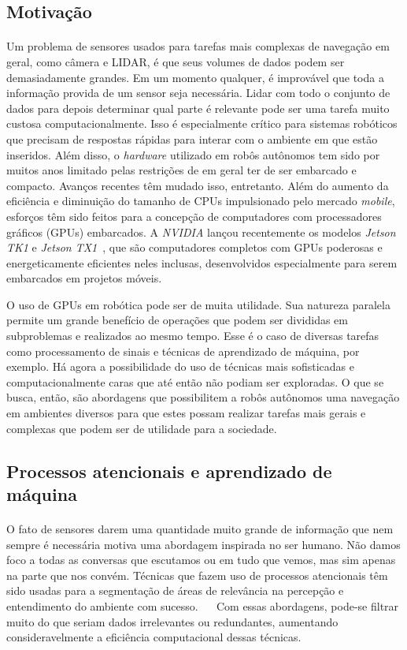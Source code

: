 \documentclass[10pt]{article}
\newcommand{\tit}[1]{\textit{#1}}
\begin{document}
\subsection{Motivação}
\paragraph{}
Um problema de sensores usados para tarefas mais complexas de navegação
em geral, como câmera e LIDAR, 
é que seus volumes de dados podem ser demasiadamente grandes. 
Em um momento qualquer, é improvável que 
toda a informação provida de um sensor seja necessária. 
Lidar com todo o conjunto de dados para depois determinar qual parte é 
relevante pode ser uma tarefa muito custosa computacionalmente. 
Isso é especialmente crítico para sistemas robóticos que precisam de respostas
rápidas para interar com o ambiente em que estão inseridos. 
Além disso, o \tit{hardware} utilizado em robôs autônomos tem sido por muitos 
anos limitado pelas restrições de em geral ter de ser embarcado e compacto.
Avanços recentes têm mudado isso, entretanto. 
Além do aumento da eficiência e diminuição do tamanho de CPUs impulsionado
pelo mercado \tit{mobile}, esforços têm sido feitos para a concepção de 
computadores com processadores gráficos (GPUs) embarcados. 
A \tit{NVIDIA} lançou recentemente os modelos 
\tit{Jetson TK1} e \tit{Jetson TX1}~\cite{jetson}, que são computadores 
completos com GPUs poderosas e energeticamente eficientes neles inclusas, 
desenvolvidos especialmente para serem embarcados em projetos móveis.

O uso de GPUs em robótica pode ser de muita utilidade.
Sua natureza paralela permite um grande benefício de operações que podem ser
divididas em subproblemas e realizados ao mesmo tempo. 
Esse é o caso de diversas tarefas como processamento de sinais e técnicas 
de aprendizado de máquina, por exemplo. 
Há agora a possibilidade do uso de técnicas mais sofisticadas
e computacionalmente caras que até então não podiam ser exploradas.
O que se busca, então, são abordagens que possibilitem a robôs autônomos
uma navegação em ambientes diversos para que estes possam realizar tarefas
mais gerais e complexas que podem ser de utilidade para a sociedade.

\subsection{Processos atencionais e aprendizado de máquina}
\paragraph{}
O fato de sensores darem uma quantidade muito grande de informação que nem 
sempre é necessária motiva uma abordagem inspirada no ser humano.
Não damos foco a todas as conversas que escutamos ou em tudo que vemos, mas sim 
apenas na parte que nos convém. 
Técnicas que fazem uso de processos atencionais têm sido usadas para a 
segmentação de áreas de relevância na percepção e entendimento do 
ambiente com sucesso. ~\cite{bio}~\cite{esther}
Com essas abordagens, pode-se filtrar muito do que seriam dados irrelevantes ou
redundantes, aumentando consideravelmente a eficiência computacional dessas
técnicas.
\end{document}
